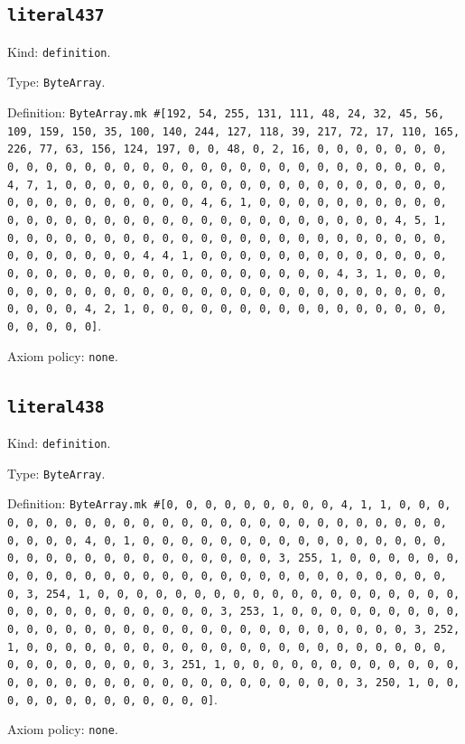 \documentclass[11pt]{article}
\begin{document}
\subsection*{\texttt{literal437}}
\noindent Kind: \texttt{definition}.\par
\noindent Type: \texttt{ByteArray}.\par
\noindent Definition: \texttt{ByteArray.mk \#[192, 54, 255, 131, 111, 48, 24, 32, 45, 56, 109, 159, 150, 35, 100, 140, 244, 127, 118, 39, 217, 72, 17, 110, 165, 226, 77, 63, 156, 124, 197, 0, 0, 48, 0, 2, 16, 0, 0, 0, 0, 0, 0, 0, 0, 0, 0, 0, 0, 0, 0, 0, 0, 0, 0, 0, 0, 0, 0, 0, 0, 0, 0, 0, 0, 0, 0, 4, 7, 1, 0, 0, 0, 0, 0, 0, 0, 0, 0, 0, 0, 0, 0, 0, 0, 0, 0, 0, 0, 0, 0, 0, 0, 0, 0, 0, 0, 0, 0, 0, 4, 6, 1, 0, 0, 0, 0, 0, 0, 0, 0, 0, 0, 0, 0, 0, 0, 0, 0, 0, 0, 0, 0, 0, 0, 0, 0, 0, 0, 0, 0, 0, 0, 4, 5, 1, 0, 0, 0, 0, 0, 0, 0, 0, 0, 0, 0, 0, 0, 0, 0, 0, 0, 0, 0, 0, 0, 0, 0, 0, 0, 0, 0, 0, 0, 0, 4, 4, 1, 0, 0, 0, 0, 0, 0, 0, 0, 0, 0, 0, 0, 0, 0, 0, 0, 0, 0, 0, 0, 0, 0, 0, 0, 0, 0, 0, 0, 0, 0, 4, 3, 1, 0, 0, 0, 0, 0, 0, 0, 0, 0, 0, 0, 0, 0, 0, 0, 0, 0, 0, 0, 0, 0, 0, 0, 0, 0, 0, 0, 0, 0, 0, 4, 2, 1, 0, 0, 0, 0, 0, 0, 0, 0, 0, 0, 0, 0, 0, 0, 0, 0, 0, 0, 0, 0, 0]}.\par
\noindent Axiom policy: \texttt{none}.\par
\subsection*{\texttt{literal438}}
\noindent Kind: \texttt{definition}.\par
\noindent Type: \texttt{ByteArray}.\par
\noindent Definition: \texttt{ByteArray.mk \#[0, 0, 0, 0, 0, 0, 0, 0, 0, 4, 1, 1, 0, 0, 0, 0, 0, 0, 0, 0, 0, 0, 0, 0, 0, 0, 0, 0, 0, 0, 0, 0, 0, 0, 0, 0, 0, 0, 0, 0, 0, 0, 4, 0, 1, 0, 0, 0, 0, 0, 0, 0, 0, 0, 0, 0, 0, 0, 0, 0, 0, 0, 0, 0, 0, 0, 0, 0, 0, 0, 0, 0, 0, 0, 0, 3, 255, 1, 0, 0, 0, 0, 0, 0, 0, 0, 0, 0, 0, 0, 0, 0, 0, 0, 0, 0, 0, 0, 0, 0, 0, 0, 0, 0, 0, 0, 0, 0, 3, 254, 1, 0, 0, 0, 0, 0, 0, 0, 0, 0, 0, 0, 0, 0, 0, 0, 0, 0, 0, 0, 0, 0, 0, 0, 0, 0, 0, 0, 0, 0, 0, 3, 253, 1, 0, 0, 0, 0, 0, 0, 0, 0, 0, 0, 0, 0, 0, 0, 0, 0, 0, 0, 0, 0, 0, 0, 0, 0, 0, 0, 0, 0, 0, 0, 3, 252, 1, 0, 0, 0, 0, 0, 0, 0, 0, 0, 0, 0, 0, 0, 0, 0, 0, 0, 0, 0, 0, 0, 0, 0, 0, 0, 0, 0, 0, 0, 0, 3, 251, 1, 0, 0, 0, 0, 0, 0, 0, 0, 0, 0, 0, 0, 0, 0, 0, 0, 0, 0, 0, 0, 0, 0, 0, 0, 0, 0, 0, 0, 0, 0, 3, 250, 1, 0, 0, 0, 0, 0, 0, 0, 0, 0, 0, 0, 0, 0]}.\par
\noindent Axiom policy: \texttt{none}.\par
\end{document}
